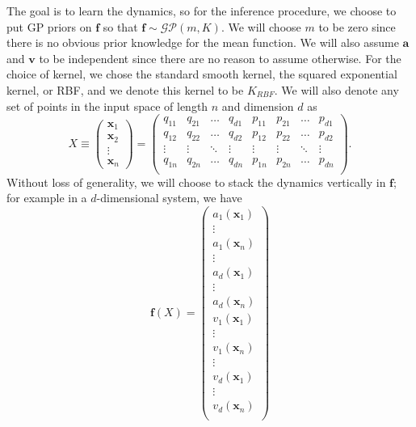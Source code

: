 \documentclass{statsmsc}
\begin{document}
The goal is to learn the dynamics, so for the inference procedure, we choose to put GP priors on $\mathbf{f}$ so that $\mathbf{f}\sim\mathcal{GP}(m, K)$.
We will choose $m$ to be zero since there is no obvious prior knowledge for the mean function.
We will also assume $\mathbf{a}$ and $\mathbf{v}$ to be independent since there are no reason to assume otherwise. 
For the choice of kernel, we chose the standard smooth kernel, the squared exponential kernel, or RBF, and we denote this kernel to be $K_{RBF}$. 
We will also denote any set of points in the input space of length $n$ and dimension $d$ as $$X\equiv\begin{pmatrix}
    \mathbf{x}_1\\\mathbf{x}_2\\\vdots\\\mathbf{x}_n
\end{pmatrix}=\begin{pmatrix}
    q_{11}& q_{21} &\dots& q_{d1} & p_{11} & p_{21} & \dots & p_{d1} \\
    q_{12}& q_{22} &\dots& q_{d2} & p_{12} & p_{22} & \dots & p_{d2} \\
    \vdots &\vdots &\ddots &\vdots &\vdots &\vdots &\ddots &\vdots \\
    q_{1n}& q_{2n} &\dots& q_{dn} & p_{1n} & p_{2n} & \dots & p_{dn} \\
\end{pmatrix}.$$
Without loss of generality, we will choose to stack the dynamics vertically in $\mathbf{f}$; for example in a $d$-dimensional system, we have \begin{equation}\mathbf{f}(X)=\begin{pmatrix}
    a_1(\mathbf{x}_1)\\
    \vdots\\
    a_1(\mathbf{x}_n)\\
    \vdots\\
    a_d(\mathbf{x}_1)\\
    \vdots\\
    a_d(\mathbf{x}_n)\\
    v_1(\mathbf{x}_1)\\
    \vdots\\
    v_1(\mathbf{x}_n)\\
    \vdots\\
    v_d(\mathbf{x}_1)\\
    \vdots\\
    v_d(\mathbf{x}_n)\\
\end{pmatrix}\label{equ:stacked}\end{equation}
\end{document}

